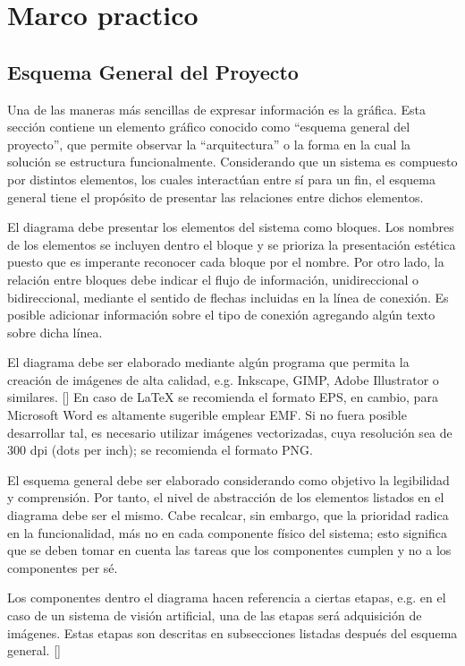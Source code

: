 \chapter{Marco practico}
\label{sec:practico}
\section{Esquema General del Proyecto}
Una de las maneras más sencillas de expresar información es la gráfica. Esta sección contiene un elemento gráfico conocido como “esquema general del proyecto”, que permite observar la “arquitectura” o la forma en la cual la solución se estructura funcionalmente. Considerando que un sistema es compuesto por distintos elementos, los cuales interactúan entre sí para un fin, el esquema general tiene el propósito de presentar las relaciones entre dichos elementos.

El diagrama debe presentar los elementos del sistema como bloques. Los nombres de los elementos se incluyen dentro el bloque y se prioriza la presentación estética puesto que es imperante reconocer cada bloque por el nombre. Por otro lado, la relación entre bloques debe indicar el flujo de información, unidireccional o bidireccional, mediante el sentido de flechas incluidas en la línea de conexión. Es posible adicionar información sobre el tipo de conexión agregando algún texto sobre dicha línea. 

El diagrama debe ser elaborado mediante algún programa que permita la creación de imágenes de alta calidad, e.g. Inkscape, GIMP, Adobe Illustrator o similares. [\cite{lynch2005where}] En caso de LaTeX se recomienda el formato EPS, en cambio, para Microsoft Word es altamente sugerible emplear EMF. Si no fuera posible desarrollar tal, es necesario utilizar imágenes vectorizadas, cuya resolución sea de 300 dpi (dots per inch); se recomienda el formato PNG.

El esquema general debe ser elaborado considerando como objetivo la legibilidad y comprensión. Por tanto, el nivel de abstracción de los elementos listados en el diagrama debe ser el mismo. Cabe recalcar, sin embargo, que la prioridad radica en la funcionalidad, más no en cada componente físico del sistema; esto significa que se deben tomar en cuenta las tareas que los componentes cumplen y no a los componentes per sé.

Los componentes dentro el diagrama hacen referencia a ciertas etapas, e.g. en el caso de un sistema de visión artificial, una de las etapas será adquisición de imágenes. Estas etapas son descritas en subsecciones listadas después del esquema general. [\cite{bratkova2008metody}]

